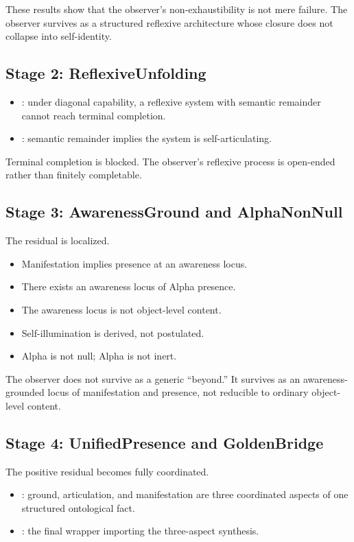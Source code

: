 \documentclass[11pt]{article}
\theoremstyle{plain}
\theoremstyle{definition}
\theoremstyle{remark}
\begin{document}
These results show that the observer's non-exhaustibility is not mere
failure.  The observer survives as a structured reflexive architecture
whose closure does not collapse into self-identity.

\subsection*{Stage 2: ReflexiveUnfolding}

\begin{itemize}[nosep]
\item {}: under diagonal
      capability, a reflexive system with semantic remainder cannot reach
      terminal completion.
\item {}: semantic
      remainder implies the system is self-articulating.
\end{itemize}

Terminal completion is blocked.  The observer's reflexive process is
open-ended rather than finitely completable.

\subsection*{Stage 3: AwarenessGround and AlphaNonNull}

The residual is localized.
\begin{itemize}[nosep]
\item Manifestation implies presence at an awareness locus.
\item There exists an awareness locus of Alpha presence.
\item The awareness locus is not object-level content.
\item Self-illumination is derived, not postulated.
\item Alpha is not null; Alpha is not inert.
\end{itemize}

The observer does not survive as a generic ``beyond.''  It survives as an
awareness-grounded locus of manifestation and presence, not reducible to
ordinary object-level content.

\subsection*{Stage 4: UnifiedPresence and GoldenBridge}

The positive residual becomes fully coordinated.
\begin{itemize}[nosep]
\item {}: ground, articulation, and
      manifestation are three coordinated aspects of one structured
      ontological fact.
\item {}: the final wrapper importing the
      three-aspect synthesis.
\end{itemize}
\end{document}
